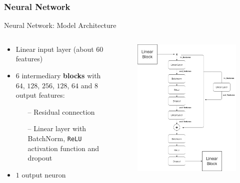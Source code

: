 \documentclass[ngerman,inputenc]{beamer}
\begin{document}
\subsubsection{Neural Network}

\begin{frame}{Neural Network: Model Architecture}

  \begin{columns}
    \begin{column}{0.5\textwidth}
      \begin{itemize}
        \item Linear input layer (about $60$ features)
        \item $6$ intermediary \textbf{blocks} with $64$, $128$, $256$, $128$, $64$ and $8$ output features:
              \begin{itemize}
                \item[–] Residual connection
                \item[–] Linear layer with BatchNorm, \texttt{ReLU} activation function and dropout
              \end{itemize}
        \item $1$ output neuron
      \end{itemize}
    \end{column}
    \begin{column}{0.5\textwidth}
      \begin{center}
        \begin{figure}
          \includegraphics[width=\columnwidth]{mlp_architecture.png}

\end{figure}
\end{center}
\end{column}
\end{columns}
\end{frame}
\end{document}
